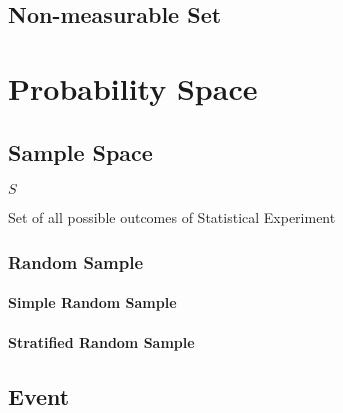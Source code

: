 \subsection{Non-measurable Set}\label{sec:nonmeasurable_set}



\section{Probability Space}\label{sec:probability_space}

\subsection{Sample Space}\label{sec:sample_space}

$S$

Set of all possible outcomes of Statistical Experiment



\subsubsection{Random Sample}\label{sec:random_sample}

\paragraph{Simple Random Sample}\label{sec:simple_random_sample}

\paragraph{Stratified Random Sample}\label{sec:stratified_random_sample}



\subsection{Event}\label{sec:event}

